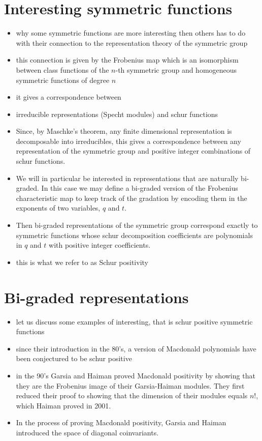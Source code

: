 \documentclass[12pt]{article}
\begin{document}
    \section{Interesting symmetric functions}
    \begin{itemize}
        \item why some symmetric functions are more interesting then others has to do with their connection to the representation theory of the symmetric group
        \item this connection is given by the Frobenius map which is an isomorphism between class functions of the $n$-th symmetric group and homogeneous symmetric functions of degree $n$
        \item it gives a correspondence between 
        \item irreducible representations (Specht modules) and schur functions
        \item Since, by Maschke's theorem, any finite dimensional representation is decomposable into irreducibles, this gives a correspondence between any representation of the symmetric group and positive integer combinations of schur functions. 
        \item 
        We will in particular be interested in representations that are naturally bi-graded. In this case we may define a bi-graded version of the Frobenius characteristic map to keep track of the gradation by encoding them in the exponents of two variables, $q$ and $t$.
        \item Then bi-graded representations of the symmetric group correspond exactly to symmetric functions whose schur decomposition coefficients are polynomials in $q$ and $t$ with positive integer coefficients.
        \item this is what we refer to as Schur positivity
    \end{itemize}
    
    \section{Bi-graded representations}
    \begin{itemize}
        \item let us discuss some examples of interesting, that is schur positive symmetric functions
        \item since their introduction in the 80's, a version of Macdonald polynomials have been conjectured to be schur positive
        \item in the 90's Garsia and Haiman proved Macdonald positivity by showing that they are the Frobenius image of their Garsia-Haiman modules. They first reduced their proof to showing that the dimension of their modules equals $n!$, which Haiman proved in 2001. 
        \item In the process of proving Macdonald positivity, Garsia and Haiman introduced the space of diagonal coinvariants.
    \end{itemize}
\end{document}
